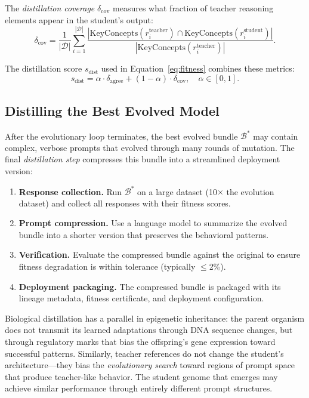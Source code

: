 \begin{dogmadef}
The \emph{distillation coverage} $\delta_{\text{cov}}$ measures what fraction of teacher reasoning elements appear in the student's output:
\begin{equation}
\delta_{\text{cov}} = \frac{1}{|\mathcal{D}|} \sum_{i=1}^{|\mathcal{D}|} \frac{|\text{KeyConcepts}(r_i^{\text{teacher}}) \cap \text{KeyConcepts}(r_i^{\text{student}})|}{|\text{KeyConcepts}(r_i^{\text{teacher}})|}.
\end{equation}
\end{dogmadef}

The distillation score $s_{\text{dist}}$ used in Equation~\ref{eq:fitness} combines these metrics:
\begin{equation}
s_{\text{dist}} = \alpha \cdot \delta_{\text{agree}} + (1 - \alpha) \cdot \delta_{\text{cov}}, \quad \alpha \in [0, 1].
\end{equation}

\subsection{Distilling the Best Evolved Model}

After the evolutionary loop terminates, the best evolved bundle $\mathcal{B}^*$ may contain complex, verbose prompts that evolved through many rounds of mutation. The final \emph{distillation step} compresses this bundle into a streamlined deployment version:

\begin{enumerate}[leftmargin=1.8em]
  \item \textbf{Response collection.} Run $\mathcal{B}^*$ on a large dataset (10$\times$ the evolution dataset) and collect all responses with their fitness scores.
  \item \textbf{Prompt compression.} Use a language model to summarize the evolved bundle into a shorter version that preserves the behavioral patterns.
  \item \textbf{Verification.} Evaluate the compressed bundle against the original to ensure fitness degradation is within tolerance (typically $\leq$2\%).
  \item \textbf{Deployment packaging.} The compressed bundle is packaged with its lineage metadata, fitness certificate, and deployment configuration.
\end{enumerate}

\begin{keyinsight}
Biological distillation has a parallel in epigenetic inheritance: the parent organism does not transmit its learned adaptations through DNA sequence changes, but through regulatory marks that bias the offspring's gene expression toward successful patterns. Similarly, teacher references do not change the student's architecture---they bias the \emph{evolutionary search} toward regions of prompt space that produce teacher-like behavior. The student genome that emerges may achieve similar performance through entirely different prompt structures.
\end{keyinsight}

